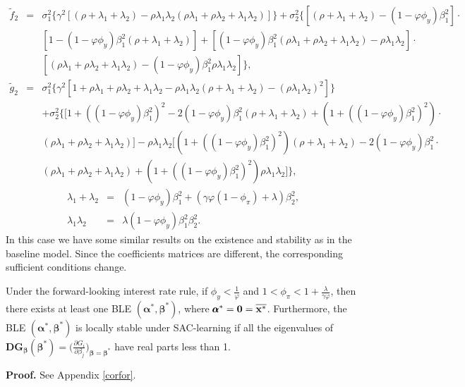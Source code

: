 \begin{eqnarray*}
\widetilde{f}_2&=&\sigma_1^2\Big\{\gamma^2[(\rho+\lambda_1+\lambda_2)-\rho\lambda_1\lambda_2(\rho\lambda_1+\rho\lambda_2+\lambda_1\lambda_2)]\Big\}+\sigma_2^2\Big\{[(\rho+\lambda_1+\lambda_2)-(1-\varphi\phi_y)\beta_1^2]\cdot\\
&&[1-(1-\varphi\phi_y)\beta_1^2(\rho+\lambda_1+\lambda_2)]+[(1-\varphi\phi_y)\beta_1^2(\rho\lambda_1+\rho\lambda_2+\lambda_1\lambda_2)-\rho\lambda_1\lambda_2]\cdot\\
&&[(\rho\lambda_1+\rho\lambda_2+\lambda_1\lambda_2)-(1-\varphi\phi_y)\beta_1^2\rho\lambda_1\lambda_2]\Big\},\\
\widetilde{g}_2&=&\sigma_1^2\Big\{\gamma^2[1+\rho\lambda_1+\rho\lambda_2+\lambda_1\lambda_2-\rho\lambda_1\lambda_2(\rho+\lambda_1+\lambda_2)-(\rho\lambda_1\lambda_2)^2]\Big\}\\
&&+\sigma_2^2\Big\{[1+((1-\varphi\phi_y)\beta_1^2)^2-2(1-\varphi\phi_y)\beta_1^2(\rho+\lambda_1+\lambda_2)+(1+((1-\varphi\phi_y)\beta_1^2)^2)\cdot\\
&&(\rho\lambda_1+\rho\lambda_2+\lambda_1\lambda_2)]-\rho\lambda_1\lambda_2[(1+((1-\varphi\phi_y)\beta_1^2)^2)(\rho+\lambda_1+\lambda_2)-2(1-\varphi\phi_y)\beta_1^2\cdot\\
&&(\rho\lambda_1+\rho\lambda_2+\lambda_1\lambda_2)+(1+((1-\varphi\phi_y)\beta_1^2)^2)\rho\lambda_1\lambda_2]\Big\},
\end{eqnarray*}
\begin{eqnarray*}
\lambda_1+\lambda_2&=&(1-\varphi\phi_y)\beta_1^2+(\gamma\varphi(1-\phi_\pi)+\lambda)\beta_2^2,\\
\lambda_1\lambda_2&=&\lambda(1-\varphi\phi_y)\beta_1^2\beta_2^2.
\end{eqnarray*}
In this case we have some similar results on the existence and stability as in the baseline model. Since the coefficients matrices are different, the corresponding sufficient conditions change.
\begin{cor}
\label{cor:exp} Under the forward-looking interest rate rule, if $\phi_y<\frac{1}{\varphi}$ and $1<\phi_\pi<1+\frac{\lambda}{\gamma\varphi}$, then there
exists at least one BLE $(\pmb\alpha^*,\pmb\beta^*)$, where
$\pmb\alpha^*=\bf 0=\overline{\bf x^*}$. Furthermore, the BLE $(\pmb\alpha^*,{\pmb\beta}^*)$ is locally
stable under SAC-learning if all the eigenvalues of $\pmb D\pmb G_{\pmb\beta}(\pmb\beta^*)=\Big(\frac{\partial G_i}{\partial \beta_j}\Big)_{{\pmb\beta}={\pmb\beta}^*}$ have real parts less than 1.
\end{cor}
\textbf{Proof.} See Appendix \ref{corfor}.

